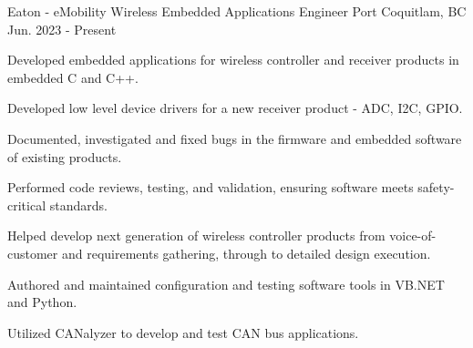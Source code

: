 


\begin{cventries}
    \cventry
    {Eaton - eMobility Wireless} %
    {Embedded Applications Engineer} %
    {Port Coquitlam, BC} %
    {Jun. 2023 - Present} %
    { %
        \begin{cvitems}
            \item {Developed embedded applications for wireless controller and receiver products in embedded C and C++.}
            \item {Developed low level device drivers for a new receiver product - ADC, I2C, GPIO.}
            \item {Documented, investigated and fixed bugs in the firmware and embedded software of existing products.}
            \item {Performed code reviews, testing, and validation, ensuring software meets safety-critical standards.}
            \item {Helped develop next generation of wireless controller products from voice-of-customer and requirements gathering, through to detailed design execution.}
            \item {Authored and maintained configuration and testing software tools in VB.NET and Python.}
            \item {Utilized CANalyzer to develop and test CAN bus applications. }
        \end{cvitems}
        \vspace{3mm}
        \vspace{1mm}
    }


\end{cventries}
